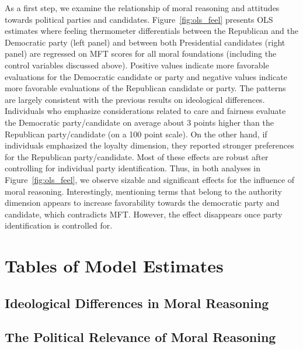 \documentclass[12pt]{article}
\begin{document}
As a first step, we examine the relationship of moral reasoning and attitudes towards political parties and candidates. Figure~\ref{fig:ols_feel} presents OLS estimates where feeling thermometer differentials between the Republican and the Democratic party (left panel) and between both Presidential candidates (right panel) are regressed on MFT scores for all moral foundations (including the control variables discussed above). Positive values indicate more favorable evaluations for the Democratic candidate or party and negative values indicate more favorable evaluations of the Republican candidate or party. The patterns are largely consistent with the previous results on ideological differences. Individuals who emphasize considerations related to care and fairness evaluate the Democratic party/candidate on average about 3 points higher than the Republican party/candidate (on a 100 point scale). On the other hand, if individuals emphasized the loyalty dimension, they reported stronger preferences for the Republican party/candidate. Most of these effects are robust after controlling for individual party identification. Thus, in both analyses in Figure~\ref{fig:ols_feel}, we observe sizable and significant effects for the influence of moral reasoning. Interestingly, mentioning terms that belong to the authority dimension appears to increase favorability towards the democratic party and candidate, which contradicts MFT. However, the effect disappears once party identification is controlled for.



\clearpage
\section{Tables of Model Estimates}\label{app:tables}
\renewcommand\thefigure{\thesection.\arabic{figure}}
\renewcommand\thetable{\thesection.\arabic{table}}
\setcounter{figure}{0}
\setcounter{table}{0}


\subsection*{Ideological Differences in Moral Reasoning}


\clearpage
\subsection*{The Political Relevance of Moral Reasoning}


\end{document}
